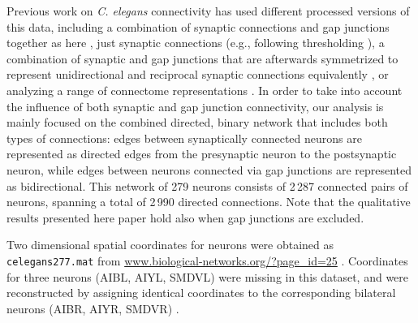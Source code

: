 \documentclass[10pt,letterpaper]{article}
\begin{document}
Previous work on \emph{C. elegans} connectivity has used different processed versions of this data, including a combination of synaptic connections and gap junctions together as here \cite{Azulay:2016cg, Kim:2016gl}, just synaptic connections (e.g., following thresholding \cite{Kashtan:2004ev}), a combination of synaptic and gap junctions that are afterwards symmetrized to represent unidirectional and reciprocal synaptic connections equivalently \cite{Towlson:2013gf, Kim:2014bu, Pavlovic:2014gx}, or analyzing a range of connectome representations \cite{Pan:2010jt}.
In order to take into account the influence of both synaptic and gap junction connectivity, our analysis is mainly focused on the combined directed, binary network that includes both types of connections: edges between synaptically connected neurons are represented as directed edges from the presynaptic neuron to the postsynaptic neuron, while edges between neurons connected via gap junctions are represented as bidirectional.
This network of 279 neurons consists of 2\,287 connected pairs of neurons, spanning a total of 2\,990 directed connections.
Note that the qualitative results presented here paper hold also when gap junctions are excluded.

Two dimensional spatial coordinates for neurons were obtained as \texttt{celegans277.mat} from \url{www.biological-networks.org/?page_id=25} \cite{choe2004network}.
Coordinates for three neurons (AIBL, AIYL, SMDVL) were missing in this dataset, and were reconstructed by assigning identical coordinates to the corresponding bilateral neurons (AIBR, AIYR, SMDVR) \cite{Varier2011}.
\end{document}
